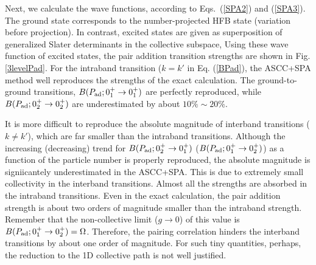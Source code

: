 \documentclass[%
superscriptaddress,
showpacs,
nofootinbib,
amsmath,amssymb,
aps,
prc,
twocolumn,
floatfix ]%
{revtex4-1}
\begin{document}
Next, we calculate the wave functions,
according to Eqs.~(\ref{SPA2}) and (\ref{SPA3}).
The ground state corresponds to the number-projected HFB state
(variation before projection).
In contrast, excited states are given as superposition of
generalized Slater determinants in the collective subspace,
Using these wave function of excited states, 
the pair addition transition strengths
are shown in Fig. \ref{3levelPad}.
For the intraband transition ($k=k'$ in Eq. (\ref{BPad}),
the ASCC+SPA method well reproduces the strengths of the exact calculation.
The ground-to-ground transitions, $B(P_{\rm ad};0_1^+\rightarrow 0_1^+)$
are perfectly reproduced, while
$B(P_{\rm ad};0_2^+\rightarrow 0_2^+)$ are underestimated 
by about $10\%\sim20\%$.

It is more difficult to reproduce the absolute magnitude of
interband transitions ($k\neq k'$), 
which are far smaller than the intraband transitions.
Although the increasing (decreasing) trend for
$B(P_{\rm ad};0_2^+\rightarrow 0_1^+)$
($B(P_{\rm ad};0_1^+\rightarrow 0_2^+)$)
as a function of the particle number is properly reproduced,
the absolute magnitude is signiicantely underestimated in the ASCC+SPA.
This is due to extremely small collectivity in the interband transitions.
Almost all the strengths are absorbed in the intraband transitions.
Even in the exact calculation, the pair addition strength is
about two orders of magnitude smaller than the intraband strength.
Remember that the non-collective limit ($g\rightarrow 0$) of this
value is $B(P_{\rm ad};0_1^+\rightarrow 0_2^+)=\Omega$.
Therefore, the pairing correlation hinders the interband transitions
by about one order of magnitude.
For such tiny quantities, perhaps, 
the reduction to the 1D collective path is not well justified.


\end{document}
